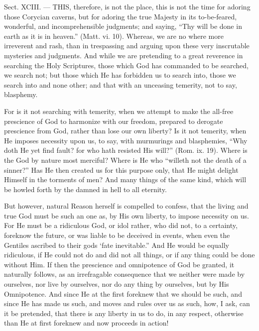 
Sect. XCIII. — THIS, therefore, is not the place, this is not the time for adoring those Corycian caverns, but for adoring the true Majesty in its to-be-feared, wonderful, and incomprehensible judgments; and saying, “Thy will be done in earth as it is in heaven.” (Matt. vi. 10). Whereas, we are no where more irreverent and rash, than in trespassing and arguing upon these very inscrutable mysteries and judgments. And while we are pretending to a great reverence in searching the Holy Scriptures, those which God has commanded to be searched, we search not; but those which He has forbidden us to search into, those we search into and none other; and that with an unceasing temerity, not to say, blasphemy.

For is it not searching with temerity, when we attempt to make the all-free prescience of God to harmonize with our freedom, prepared to derogate prescience from God, rather than lose our own liberty? Is it not temerity, when He imposes necessity upon us, to say, with murmurings and blasphemies, “Why doth He yet find fault? for who hath resisted His will?” (Rom. ix. 19). Where is the God by nature most merciful? Where is He who “willeth not the death of a sinner?” Has He then created us for this purpose only, that He might delight Himself in the torments of men? And many things of the same kind, which will be howled forth by the damned in hell to all eternity.

But however, natural Reason herself is compelled to confess, that the living and true God must be such an one as, by His own liberty, to impose necessity on us. For He must be a ridiculous God, or idol rather, who did not, to a certainty, foreknow the future, or was liable to be deceived in events, when even the Gentiles ascribed to their gods ‘fate inevitable.” And He would be equally ridiculous, if He could not do and did not all things, or if any thing could be done without Him. If then the prescience and omnipotence of God be granted, it naturally follows, as an irrefragable consequence that we neither were made by ourselves, nor live by ourselves, nor do any thing by ourselves, but by His Omnipotence. And since He at the first foreknew that we should be such, and since He has made us such, and moves and rules over us as such, how, I ask, can it be pretended, that there is any liberty in us to do, in any respect, otherwise than He at first foreknew and now proceeds in action!

